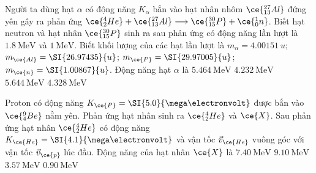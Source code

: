 \begin{ex}
	Người ta dùng hạt $\alpha$ có động năng $K_{\alpha}$  bắn vào hạt nhân nhôm $\ce{^{27}_{13}Al}$  đứng yên gây ra phản ứng $\ce{^4_2He}+\ce{^{27}_{13}Al}\longrightarrow\ce{^{30}_{15}P}+\ce{^1_0n}$.  Biết hạt neutron và hạt nhân $\ce{^{30}_{15}P}$  sinh ra sau phản ứng có động năng lần lượt là $\SI{1.8}{\mega\electronvolt}$ và $\SI{1}{\mega\electronvolt}$. Biết khối lượng của các hạt lần lượt là $m_{\alpha}=\SI{4.00151}{u}$; $m_{\ce{Al}}=\SI{26.97435}{u}$; $m_{\ce{P}}=\SI{29.97005}{u}$; $m_{\ce{n}}=\SI{1.00867}{u}$. Động năng hạt $\alpha$ là 
	\choice
	{\True $\SI{5.464}{\mega\electronvolt}$}
	{$\SI{4.232}{\mega\electronvolt}$}
	{$\SI{5.644}{\mega\electronvolt}$}
	{$\SI{4.328}{\mega\electronvolt}$}
\end{ex}
\begin{ex}
	Proton có động năng $K_{\ce{P}}=\SI{5.0}{\mega\electronvolt}$ được bắn vào $\ce{^9_4Be}$  nằm yên. Phản ứng hạt nhân sinh ra $\ce{^4_2He}$   và $\ce{X}$. Sau phản ứng hạt nhân $\ce{^4_2He}$  có động năng  $K_{\ce{He}}=\SI{4.1}{\mega\electronvolt}$ và vận tốc $\vec{v}_{\ce{He}}$   vuông góc với vận tốc $\vec{v}_{\ce{p}}$   lúc đầu. Động năng của hạt nhân $\ce{X}$ là
	\choice
	{$\SI{7.40}{\mega\electronvolt}$}
	{$\SI{9.10}{\mega\electronvolt}$}
	{\True $\SI{3.57}{\mega\electronvolt}$}
	{$\SI{0.90}{\mega\electronvolt}$}
\end{ex}

